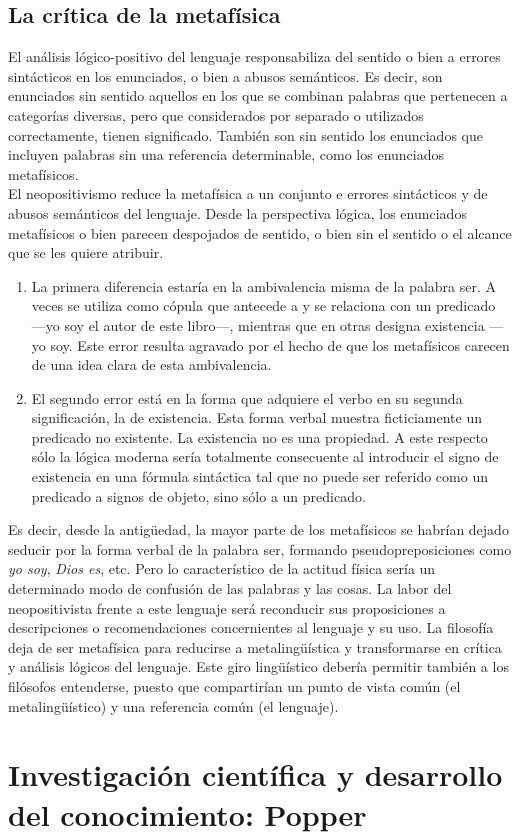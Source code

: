 \documentclass[a4paper, 11pt, twocolumn, spanish]{article}
\begin{document}
\subsection{La crítica de la metafísica}
\label{sec:org86cc4ea}
El análisis lógico-positivo del lenguaje responsabiliza del sentido o
bien a errores sintácticos en los enunciados, o bien a abusos
semánticos. Es decir, son enunciados sin sentido aquellos en los que
se combinan palabras que pertenecen a categorías diversas, pero que
considerados por separado o utilizados correctamente, tienen
significado. También son sin sentido los enunciados que incluyen
palabras sin una referencia determinable, como los enunciados
metafísicos.\\[0pt]

El neopositivismo reduce la metafísica a un conjunto e errores
sintácticos y de abusos semánticos del lenguaje. Desde la perspectiva
lógica, los enunciados metafísicos o bien parecen despojados de
sentido, o bien sin el sentido o el alcance que se les quiere
atribuir.
\begin{enumerate}
\item La primera diferencia estaría en la ambivalencia misma de la
palabra ser. A veces se utiliza como cópula que antecede a y se
relaciona con un predicado —yo soy el autor de este libro—,
mientras que en otras designa existencia —yo soy. Este error
resulta agravado por el hecho de que los metafísicos carecen de
una idea clara de esta ambivalencia.
\item El segundo error está en la forma que adquiere el verbo en su
segunda significación, la de existencia. Esta forma verbal
muestra ficticiamente un predicado no existente. La existencia no
es una propiedad. A este respecto sólo la lógica moderna sería
totalmente consecuente al introducir el signo de existencia en
una fórmula sintáctica tal que no puede ser referido como un
predicado a signos de objeto, sino sólo a un predicado.
\end{enumerate}

Es decir, desde la antigüedad, la mayor parte de los metafísicos se
habrían dejado seducir por la forma verbal de la palabra ser, formando
pseudopreposiciones como \emph{yo soy}, \emph{Dios es}, etc. Pero lo
característico de la actitud física sería un determinado modo de
confusión de las palabras y las cosas. La labor del neopositivista
frente a este lenguaje será reconducir sus proposiciones a
descripciones o recomendaciones concernientes al lenguaje y su uso.
La filosofía deja de ser metafísica para reducirse a metalingüística y
transformarse en crítica y análisis lógicos del lenguaje. Este giro
lingüístico debería permitir también a los filósofos entenderse,
puesto que compartirían un punto de vista común (el metalingüístico) y
una referencia común (el lenguaje).

\section{Investigación científica y desarrollo del conocimiento: Popper}
\label{sec:orgc11629a}
\end{document}
